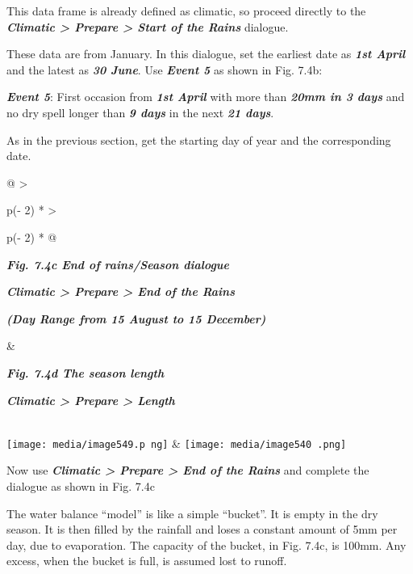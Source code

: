 \documentclass[
  letterpaper,
  DIV=11,
  numbers=noendperiod]{scrreprt}
\begin{document}
This data frame is already defined as climatic, so proceed directly to
the \textbf{\emph{Climatic \textgreater{} Prepare \textgreater{} Start
of the Rains}} dialogue.

These data are from January. In this dialogue, set the earliest date as
\textbf{\emph{1st April}} and the latest as \textbf{\emph{30 June}}. Use
\textbf{\emph{Event 5}} as shown in Fig. 7.4b:

\textbf{\emph{Event 5}}: First occasion from \textbf{\emph{1st April}}
with more than \textbf{\emph{20mm in 3 days}} and no dry spell longer
than \textbf{\emph{9 days}} in the next \textbf{\emph{21 days}}.

As in the previous section, get the starting day of year and the
corresponding date.

\begin{longtable}[]{@{}
  >{\raggedright\arraybackslash}p{(\columnwidth - 2\tabcolsep) * }
  >{\raggedright\arraybackslash}p{(\columnwidth - 2\tabcolsep) * }@{}}
\toprule\noalign{}
\begin{minipage}[b]{\linewidth}\raggedright
\textbf{\emph{Fig. 7.4c End of rains/Season dialogue}}

\textbf{\emph{Climatic \textgreater{} Prepare \textgreater{} End of the
Rains}}

\textbf{\emph{(Day Range from 15 August to 15 December)}}
\end{minipage} & \begin{minipage}[b]{\linewidth}\raggedright
\textbf{\emph{Fig. 7.4d The season length}}

\textbf{\emph{Climatic \textgreater{} Prepare \textgreater{} Length}}
\end{minipage} \\
\midrule\noalign{}
\endhead
\bottomrule\noalign{}
\endlastfoot
\texttt{[image: media/image549.p ng]}
&
\texttt{[image: media/image540 .png]} \\
\end{longtable}

Now use \textbf{\emph{Climatic \textgreater{} Prepare \textgreater{} End
of the Rains}} and complete the dialogue as shown in Fig. 7.4c

The water balance ``model'' is like a simple ``bucket''. It is empty in
the dry season. It is then filled by the rainfall and loses a constant
amount of 5mm per day, due to evaporation. The capacity of the bucket,
in Fig. 7.4c, is 100mm. Any excess, when the bucket is full, is assumed
lost to runoff.
\end{document}
